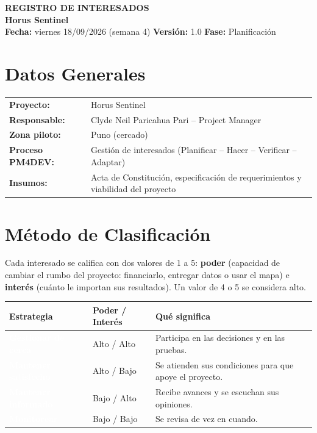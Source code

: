 \documentclass[11pt,a4paper]{article}
\newcommand{\etiqueta}[2]{{\setlength{\fboxsep}{2pt}\colorbox{#1}{\textcolor{white}{\scriptsize\bfseries #2}}}}
\newcommand{\cerca}{\etiqueta{CuadCerca}{Gestionar de cerca}}
\newcommand{\satisf}{\etiqueta{CuadSatisf}{Mantener satisfecho}}
\newcommand{\informado}{\etiqueta{CuadInfo}{Mantener informado}}
\newcommand{\monit}{\etiqueta{CuadMonit}{Monitorear}}
\begin{document}
\begin{center}
    {\Large \textbf{\textcolor{AzulUNA}{REGISTRO DE INTERESADOS}}}\\[3pt]
    {\normalsize \textbf{Horus Sentinel}}\\[4pt]
    \footnotesize \textbf{Fecha:} viernes 18/09/2026 (semana 4) \quad \textbar\quad \textbf{Versión:} 1.0 \quad \textbar\quad \textbf{Fase:} Planificación
\end{center}

\vspace{0.1cm}

\section{Datos Generales}
\noindent\begin{tabularx}{\textwidth}{@{}P{4.2cm} L@{}}
\toprule
\textbf{Proyecto:} & Horus Sentinel \\
\textbf{Responsable:} & Clyde Neil Paricahua Pari -- Project Manager \\
\textbf{Zona piloto:} & Puno (cercado) \\
\textbf{Proceso PM4DEV:} & Gestión de interesados (Planificar -- Hacer -- Verificar -- Adaptar) \\
\textbf{Insumos:} & Acta de Constitución, especificación de requerimientos y viabilidad del proyecto \\
\bottomrule
\end{tabularx}

\section{Método de Clasificación}
Cada interesado se califica con dos valores de 1 a 5: \textbf{poder} (capacidad de cambiar el rumbo del proyecto: financiarlo, entregar datos o usar el mapa) e \textbf{interés} (cuánto le importan sus resultados). Un valor de 4 o 5 se considera alto.

\vspace{0.1cm}
{\small
\noindent\begin{tabularx}{\textwidth}{@{}P{3.4cm} P{3.2cm} L@{}}
\toprule
{}
\textbf{Estrategia} & \textbf{Poder / Interés} & \textbf{Qué significa} \\
\midrule
\cerca & Alto / Alto & Participa en las decisiones y en las pruebas. \\
\satisf & Alto / Bajo & Se atienden sus condiciones para que apoye el proyecto. \\
\informado & Bajo / Alto & Recibe avances y se escuchan sus opiniones. \\
\monit & Bajo / Bajo & Se revisa de vez en cuando. \\
\bottomrule
\end{tabularx}
}
\end{document}
